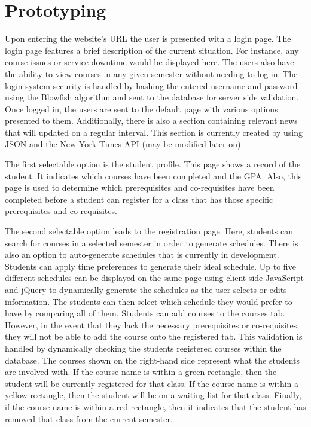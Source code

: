 \documentclass[12pt]{article}
\begin{document}
\section{Prototyping}

Upon entering the website’s URL the user is presented with a login page. The login page features a brief description of the current situation. For instance, any course issues or service downtime would be displayed here. The users also have the ability to view courses in any given semester without needing to log in. The login system security is handled by hashing the entered username and password using the Blowfish algorithm and sent to the database for server side validation. 
Once logged in, the users are sent to the default page with various options presented to them.  Additionally, there is also a section containing relevant news that will updated on a regular interval. This section is currently created by using JSON and the New York Times API (may be modified later on). 

The first selectable option is the student profile. This page shows a record of the student. It indicates which courses have been completed and the GPA. Also, this page is used to determine which prerequisites and co-requisites have been completed before a student can register for a class that has those specific prerequisites and co-requisites.

The second selectable option leads to the registration page. Here, students can search for courses in a selected semester in order to generate schedules. There is also an option to auto-generate schedules that is currently in development. Students can apply time preferences to generate their ideal schedule.  Up to five different schedules can be displayed on the same page using client side JavaScript and jQuery to dynamically generate the schedules as the user selects or edits information. The students can then select which schedule they would prefer to have by comparing all of them. Students can add courses to the courses tab. However, in the event that they lack the necessary prerequisites or co-requisites, they will not be able to add the course onto the registered tab. This validation is handled by dynamically checking the students registered courses within the database. The courses shown on the right-hand side represent what the students are involved with. If the course name is within a green rectangle, then the student will be currently registered for that class. If the course name is within a yellow rectangle, then the student will be on a waiting list for that class. Finally, if the course name is within a red rectangle, then it indicates that the student has removed that class from the current semester.
\end{document}
